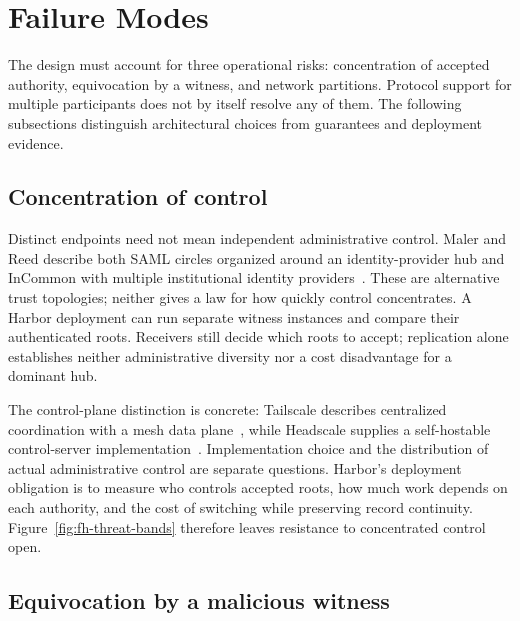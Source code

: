 \documentclass[11pt,a4paper]{article}
\theoremstyle{definition}
\theoremstyle{remark}
\begin{document}
\section{Failure Modes}\label{sec:fh-failure-modes}

The design must account for three operational risks: concentration of accepted authority, equivocation by a witness, and network partitions. Protocol support for multiple participants does not by itself resolve any of them. The following subsections distinguish architectural choices from guarantees and deployment evidence.

\subsection{Concentration of control}\label{sec:fh-centralization}

Distinct endpoints need not mean independent administrative control. Maler and Reed describe both SAML circles organized around an identity-provider hub and InCommon with multiple institutional identity providers~. These are alternative trust topologies; neither gives a law for how quickly control concentrates. A Harbor deployment can run separate witness instances and compare their authenticated roots. Receivers still decide which roots to accept; replication alone establishes neither administrative diversity nor a cost disadvantage for a dominant hub.

The control-plane distinction is concrete: Tailscale describes centralized coordination with a mesh data plane~, while Headscale supplies a self-hostable control-server implementation~. Implementation choice and the distribution of actual administrative control are separate questions. Harbor's deployment obligation is to measure who controls accepted roots, how much work depends on each authority, and the cost of switching while preserving record continuity. Figure~\ref{fig:fh-threat-bands} therefore leaves resistance to concentrated control open.

\pagebreak[4]
\subsection{Equivocation by a malicious witness}\label{sec:fh-equiv}
\end{document}

